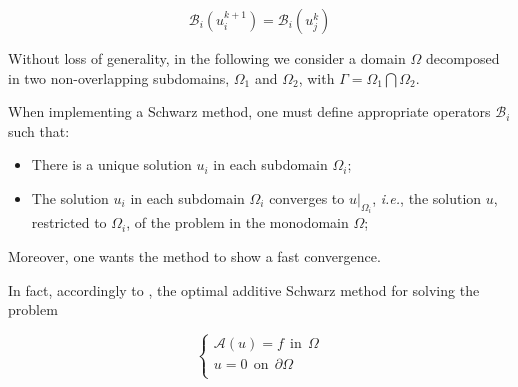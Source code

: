 \indent {}

\indent {}

\begin{equation}
	\label{eq:genericIBC}
\mathcal{B}_i(u_i^{k+1}) = \mathcal{B}_i(u_j^{k})
\end{equation}

\noindent {}

\indent Without loss of generality, in the following we consider a domain $\Omega$ decomposed in two non-overlapping subdomains, $\Omega_1$ and $\Omega_2$, with $\Gamma = \Omega_1 \bigcap \Omega_2$.

\indent When implementing a Schwarz method, one must define appropriate operators $\mathcal{B}_i$ such that:

\begin{itemize}
\begingroup \item There is a unique solution $u_i$ in each subdomain $\Omega_i$; \endgroup
\item The solution $u_i$ in each subdomain $\Omega_i$ converges to $u|_{\Omega_i}$, \emph{i.e.}, the solution $u$, restricted to $\Omega_i$, of the problem in the monodomain $\Omega$;
\end{itemize} 

\indent Moreover, one wants the method to show a fast convergence.

\indent In fact, accordingly to \cite{Japhet2003}, the optimal additive Schwarz method for solving the problem 

\begin{equation*}
\begin{cases}
\mathcal{A}(u) = f \ \ \text{in} \ \ \Omega\\
u = 0 \ \ \text{on} \ \ \partial\Omega\\
\end{cases}
\end{equation*}

